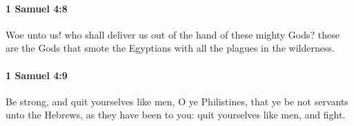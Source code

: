 		\paragraph{1 Samuel 4:8} %
			\label{1SAMUEL-4-8}

			Woe unto us! who shall deliver us out of the hand of these mighty Gods? these are the Gods that smote the Egyptians with all the plagues in the wilderness.


		\paragraph{1 Samuel 4:9} %
			\label{1SAMUEL-4-9}

			Be strong, and quit yourselves like men, O ye Philistines, that ye be not servants unto the Hebrews, as they have been to you: quit yourselves like men, and fight.


